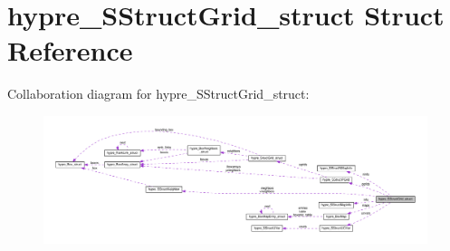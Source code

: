 \hypertarget{structhypre__SStructGrid__struct}{}\section{hypre\+\_\+\+S\+Struct\+Grid\+\_\+struct Struct Reference}
\label{structhypre__SStructGrid__struct}


Collaboration diagram for hypre\+\_\+\+S\+Struct\+Grid\+\_\+struct\+:
\nopagebreak
\begin{figure}[H]
\begin{center}
\leavevmode
\includegraphics[width=350pt]{structhypre__SStructGrid__struct__coll__graph}
\end{center}
\end{figure}
